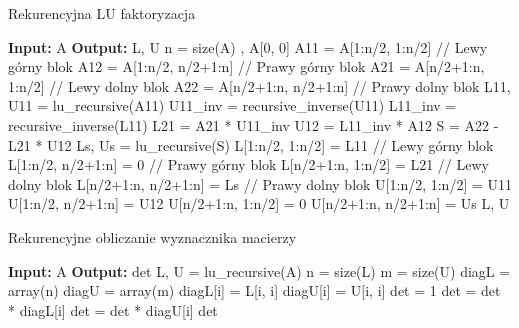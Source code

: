 \documentclass[11pt, leqno]{scrartcl}
\begin{document}
    \begin{algorithm}[H]
        \caption{Rekurencyjna LU faktoryzacja}
        \begin{algorithmic}
            \State \textbf{Input:} A
            \State \textbf{Output:} L, U
                \State n = size(A)
                    \State {}, A[0, 0]
                \EndIf
                \State
                \State A11 = A[1:n/2, 1:n/2]      // Lewy górny blok
                \State A12 = A[1:n/2, n/2+1:n]    // Prawy górny blok
                \State A21 = A[n/2+1:n, 1:n/2]    // Lewy dolny blok
                \State A22 = A[n/2+1:n, n/2+1:n]  // Prawy dolny blok
                \State
                \State L11, U11 = lu\_recursive(A11)
                \State U11\_inv = recursive\_inverse(U11)
                \State L11\_inv = recursive\_inverse(L11)
                \State
                \State L21 = A21 * U11\_inv
                \State U12 = L11\_inv * A12
                \State S = A22 - L21 * U12
                \State Ls, Us = lu\_recursive(S)
                \State
                \State L[1:n/2, 1:n/2] = L11     // Lewy górny blok
                \State L[1:n/2, n/2+1:n] = 0     // Prawy górny blok
                \State L[n/2+1:n, 1:n/2] = L21   // Lewy dolny blok
                \State L[n/2+1:n, n/2+1:n] = Ls  // Prawy dolny blok
                \State
                \State U[1:n/2, 1:n/2] = U11
                \State U[1:n/2, n/2+1:n] = U12
                \State U[n/2+1:n, 1:n/2] = 0
                \State U[n/2+1:n, n/2+1:n] = Us
                \State \Return L, U
            \EndFunction
        \end{algorithmic}
    \end{algorithm}

    \begin{algorithm}[H]
        \caption{Rekurencyjne obliczanie wyznacznika macierzy}
        \begin{algorithmic}
            \State \textbf{Input:} A
            \State \textbf{Output:} det
                \State L, U = lu\_recursive(A)
                \State n = size(L)
                \State m = size(U)
                \State diagL = array(n)
                \State diagU = array(m)
                \State
                    \State diagL[i] = L[i, i]
                \EndFor
                    \State diagU[i] = U[i, i]
                \EndFor
                \State
                \State det = 1
                    \State det = det * diagL[i]
                \EndFor
                    \State det = det * diagU[i]
                \EndFor
                \State \Return det
            \EndFunction
        \end{algorithmic}
    \end{algorithm}
\end{document}
